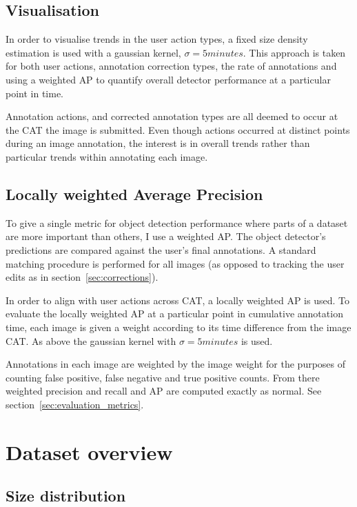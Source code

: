 \subsection{Visualisation}
\label{sec:visualisation}

In order to visualise trends in the user action types, a fixed size density estimation is used with a gaussian kernel, $\sigma=5 minutes$. This approach is taken for both user actions, annotation correction types, the rate of annotations and using a weighted \gls{AP} to quantify overall detector performance at a particular point in  time.

Annotation actions, and corrected annotation types are all deemed to occur at the \gls{CAT} the image is submitted. Even though actions occurred at distinct points during an image annotation, the interest is in overall trends rather than particular trends within annotating each image. 

\subsection {Locally weighted Average Precision}
\label{sec:noisy_trends}

To give a single metric for object detection performance where parts of a dataset are more important than others, I use a weighted \gls{AP}. The object detector's predictions are compared against the user's final annotations. A standard matching procedure is performed for all images (as opposed to tracking the user edits as in section~\ref{sec:corrections}).

In order to align with user actions across \gls{CAT}, a locally weighted \gls{AP} is used. To evaluate the locally weighted \gls{AP} at a particular point in cumulative annotation time, each image is given a weight according to its time difference from the image \gls{CAT}. As above the gaussian kernel with $\sigma=5 minutes$ is used.

Annotations in each image are weighted by the image weight for the purposes of counting false positive, false negative and true positive counts. From there weighted precision and recall and \gls{AP} are computed exactly as normal. See section~\ref{sec:evaluation_metrics}.


\section {Dataset overview}
\subsection {Size distribution}

